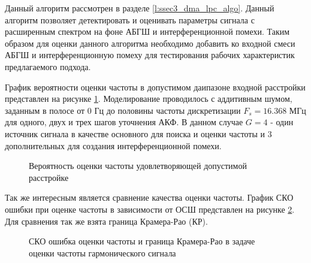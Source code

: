Данный алгоритм рассмотрен в разделе \ref{l:ssec3_dma_lpc_algo}. Данный алгоритм позволяет детектировать и оценивать параметры сигнала с расширенным спектром
на фоне АБГШ и интерференционной помехи. Таким образом для оценки данного алгоритма необходимо добавить ко входной смеси АБГШ и интерференционную помеху
для тестирования рабочих характеристик предлагаемого подхода.

График вероятности оценки частоты в допустимом даипазоне входной расстройки представлен на рисунке
\ref{pic:ar_dma_probability}. Моделирование проводилось с аддитивным шумом, заданным в полосе от 0 Гц до
половины частоты дискретизации ${F_s=16.368}$ МГц для одного, двух и трех шагов уточнения АКФ. В данном случае ${G=4}$ - 
один источник сигнала в качестве основного для поиска и оценки частоты и 3 дополнительных для создания интерференционной помехи.
\begin{figure}[H]
\center{}
	\caption{Вероятность оценки частоты удовлетворяющей допустимой расстройке}
	\label{pic:ar_dma_probability}
\end{figure}


Так же интересным является сравнение качества оценки частоты. График СКО ошибки при оценке частоты в зависимости
от ОСШ представлен на рисунке \ref{pic:crlb_vs_snr}. Для сравнения так же взята граница Крамера-Рао (КР).
\begin{figure}[H]
\center{}
	\caption{СКО ошибка оценки частоты и граница Крамера-Рао в задаче оценки частоты гармонического сигнала}
	\label{pic:crlb_vs_snr}
\end{figure}

\newpage
